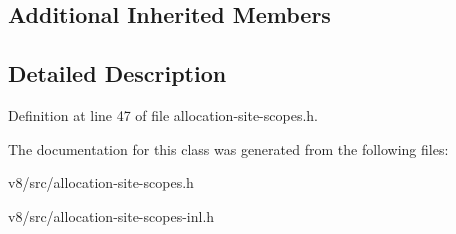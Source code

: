 \subsection*{Additional Inherited Members}


\subsection{Detailed Description}


Definition at line 47 of file allocation-\/site-\/scopes.\+h.



The documentation for this class was generated from the following files\+:\begin{DoxyCompactItemize}
\item 
v8/src/allocation-\/site-\/scopes.\+h\item 
v8/src/allocation-\/site-\/scopes-\/inl.\+h\end{DoxyCompactItemize}
